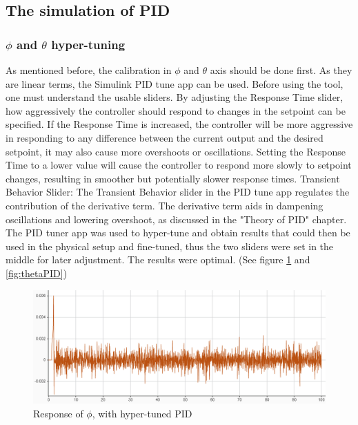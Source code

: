 \subsection{The simulation of PID}

\subsubsection{$\phi$ and $\theta$ hyper-tuning}
As mentioned before, the calibration in $\phi$ and $\theta$ axis should be done first. As they are linear terms, the Simulink PID tune app can be used. Before using the tool, one must understand the usable sliders.  
By adjusting the Response Time slider, how aggressively the controller should respond to changes in the setpoint can be specified. If the Response Time is increased, the controller will be more aggressive in responding to any difference between the current output and the desired setpoint, it may also cause more overshoots or oscillations. Setting the Response Time to a lower value will cause the controller to respond more slowly to setpoint changes, resulting in smoother but potentially slower response times.
Transient Behavior Slider:
The Transient Behavior slider in the PID tune app regulates the contribution of the derivative term. The derivative term aids in dampening oscillations and lowering overshoot, as discussed in the "Theory of PID" chapter.
The PID tuner app was used to hyper-tune and obtain results that could then be used in the physical setup and fine-tuned, thus the two sliders were set in the middle for later adjustment.
The results were optimal. (See figure \ref{fig:phiPID} and \ref{fig:thetaPID})
\begin{figure}[H]
    \begin{center}
    \includegraphics[width = \textwidth]{pictures/control/phiPID.PNG}
    \end{center}
    \caption{Response of $\phi$, with hyper-tuned PID}
    \label{fig:phiPID}
\end{figure}

